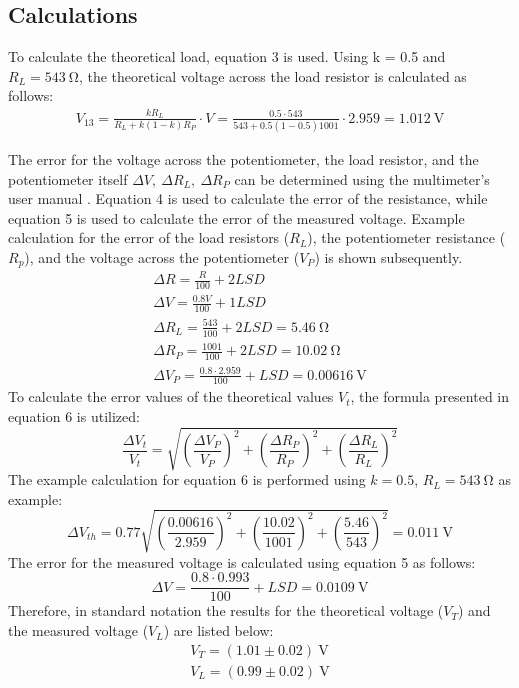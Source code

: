 \documentclass[a4paper]{article}
\newcommand{\unit}[1]{~\mathrm{#1}}
\begin{document}
\subsection{Calculations}
To calculate the theoretical load, equation 3 is used. Using k = 0.5 and $R_L =
543\unit{\Omega}$, the theoretical voltage across the load resistor is calculated as follows:
\begin{gather*}
    V_{13} = \frac{kR_L}{R_L + k(1-k) R_P} \cdot V = \frac{0.5 \cdot 543}{543 + 0.5(1-0.5)1001} \cdot 2.959 = 1.012\unit{V}
\end{gather*}

The error for the voltage across the potentiometer, the load resistor, 
and the potentiometer itself
$\Delta V, ~\Delta R_L, ~\Delta R_P$ can
be determined using the multimeter's user manual \cite{noauthor_am-500_2019}. 
Equation 4 is used to calculate the error of the resistance, 
while equation 5 is used to calculate the error of the measured voltage.
Example calculation for the error of the load resistors ($R_L$), the potentiometer resistance ($R_p$),
and the voltage across the potentiometer ($V_{P}$) is shown subsequently.
\begin{gather}
    \Delta R = \frac{R}{100} + 2LSD\\
    \Delta V = \frac{0.8 V}{100} + 1LSD\\
    \Delta R_L = \frac{543}{100} + 2LSD = 5.46\unit{\Omega} \nonumber \\
    \Delta R_P = \frac{1001}{100} + 2LSD = 10.02\unit{\Omega} \nonumber \\
    \Delta V_P = \frac{0.8 \cdot 2.959}{100} + LSD = 0.00616\unit{V} \nonumber
\end{gather} 
To calculate the error values of the theoretical values $V_{t}$, the formula presented in equation 6 is utilized\cite{unc}:
\begin{equation}
    \frac{\Delta V_{t}}{V_{t}} = \sqrt{\left( \frac{\Delta V_P}{V_P}\right) ^2 + \left( \frac{\Delta R_P}{R_P} \right) ^ 2 + \left( \frac{\Delta R_L}{R_L} \right) ^2}
\end{equation}
The example calculation for equation 6 is performed using $k = 0.5$, $R_L = 543\unit{\Omega}$ as example:
\[ \Delta V_{th} = 0.77 \sqrt{\left( \frac{0.00616}{2.959} \right) ^ 2 + \left(
\frac{10.02}{1001} \right) ^2 + \left(\frac{5.46}{543} \right) ^2 } = 0.011
\unit{V} \]
The error for the measured voltage is calculated using equation 5 as follows:
\[ \Delta V = \frac{0.8 \cdot 0.993}{100} + LSD = 0.0109\unit{V} \]
Therefore, in standard notation the results for the theoretical voltage ($V_{T}$) and the measured voltage ($V_L$) are listed below:
\begin{gather*}
    V_{T} = (1.01 \pm 0.02) \unit{V}\\
    V_L = (0.99 \pm 0.02) \unit{V}
\end{gather*}
\end{document}
